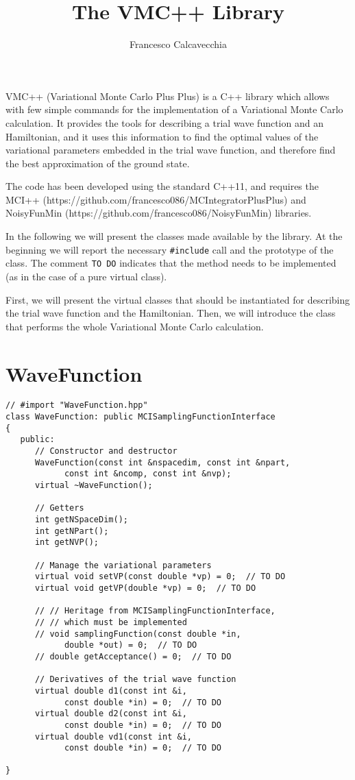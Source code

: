 \documentclass[11pt,a4paper,twoside]{article}
\title{The VMC++ Library}
\author{Francesco Calcavecchia}
\begin{document}
\maketitle

VMC++ (Variational Monte Carlo Plus Plus) is a C++ library which allows with few simple commands for the implementation of a Variational Monte Carlo calculation.
It provides the tools for describing a trial wave function and an Hamiltonian, and it uses this information to find the optimal values of the variational parameters embedded in the trial wave function, and therefore find the best approximation of the ground state.

The code has been developed using the standard C++11, and requires the MCI++ (https://github.com/francesco086/MCIntegratorPlusPlus) and NoisyFunMin (https://github.com/francesco086/NoisyFunMin) libraries.

In the following we will present the classes made available by the library.
At the beginning we will report the necessary \verb+#include+ call and the prototype of the class.
The comment \verb+TO DO+ indicates that the method needs to be implemented (as in the case of a pure virtual class).

First, we will present the virtual classes that should be instantiated for describing the trial wave function and the Hamiltonian.
Then, we will introduce the class that performs the whole Variational Monte Carlo calculation.


\section{WaveFunction} %
\label{sec:wave_function}

\begin{lstlisting}
// #import "WaveFunction.hpp"
class WaveFunction: public MCISamplingFunctionInterface
{
   public:
      // Constructor and destructor
      WaveFunction(const int &nspacedim, const int &npart,
            const int &ncomp, const int &nvp);
      virtual ~WaveFunction();

      // Getters
      int getNSpaceDim();
      int getNPart();
      int getNVP();

      // Manage the variational parameters
      virtual void setVP(const double *vp) = 0;  // TO DO
      virtual void getVP(double *vp) = 0;  // TO DO

      // // Heritage from MCISamplingFunctionInterface,
      // // which must be implemented
      // void samplingFunction(const double *in,
            double *out) = 0;  // TO DO
      // double getAcceptance() = 0;  // TO DO

      // Derivatives of the trial wave function
      virtual double d1(const int &i,
            const double *in) = 0;  // TO DO
      virtual double d2(const int &i,
            const double *in) = 0;  // TO DO
      virtual double vd1(const int &i,
            const double *in) = 0;  // TO DO

}
\end{lstlisting}
\end{document}
